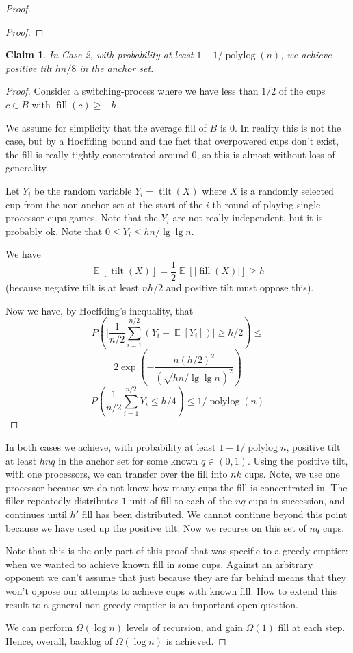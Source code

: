 \documentclass[twocolumn]{article}[11pt]
\DeclareMathOperator{\E}{\mathbb{E}}
\DeclareMathOperator{\polylog}{\text{polylog}}
\DeclareMathOperator{\tilt}{\text{tilt}}
\DeclareMathOperator{\fil}{\text{fill}}
\newtheorem{clm}{Claim}
\begin{document}
\begin{proof}
\begin{proof}
\end{proof}

\begin{clm}
  \label{clm:xtreme}
  In Case 2, with probability at least $1- 1/\polylog(n)$, we achieve positive tilt $hn/8$ in the anchor set.
\end{clm}

\begin{proof}
  Consider a switching-process where we have less than $1/2$ of the cups $c\in B$
  with $\fil(c) \ge -h$.


  We assume for simplicity that the average fill of $B$ is $0$. In reality this
  is not the case, but by a Hoeffding bound and the fact that overpowered cups don't
  exist, the fill is really tightly concentrated around $0$, so this is almost
  without loss of generality.

  Let $Y_i$ be the random variable $Y_i=\tilt(X)$ where $X$ is a randomly
  selected cup from the non-anchor set at the start of the $i$-th round of
  playing single processor cups games. {\color{red}Note that the $Y_i$ are not really
  independent, but it is probably ok}. Note that $0\le Y_i \le hn/\lg\lg n$.

  We have
  $$\E[\tilt(X)] = \frac{1}{2}\E[|\fil(X)|] \ge h$$
  (because negative tilt is at least $nh/2$ and positive tilt must oppose this).
  
  Now we have, by Hoeffding's inequality, that 
  $$P\left(\Big|\frac{1}{n/2} \sum_{i=1}^{n/2} (Y_i - \E[Y_i])\Big|\ge h/2
  \right) \le$$
  $$2\exp\left(-\frac{n(h/2)^2}{(\sqrt{hn/\lg\lg n})^2}\right) $$
  $$P\left(\frac{1}{n/2}\sum_{i=1}^{n/2} Y_i \le h/4\right) \le 1/\polylog(n) $$

\end{proof}

  In both cases we achieve, with probability at least $1-1/\polylog n$,
  positive tilt at least $hnq$ in the anchor set for some known $q\in(0,1)$. Using the
  positive tilt, with one processors, we can transfer over the fill into $nk$ cups. 
  Note, we use one processor because we do not know how many cups the fill is
  concentrated in. The filler repeatedly distributes $1$ unit of fill to each
  of the $nq$ cups in succession, and continues until $h'$ fill has been
  distributed. We cannot continue beyond this point because we have used up the
  positive tilt. Now we recurse on this set of $nq$ cups.

  Note that this is the only part of this proof that was specific to a greedy
  emptier: when we wanted to achieve known fill in some cups. Against an
  arbitrary opponent we can't assume that just because they are far behind
  means that they won't oppose our attempts to achieve cups with known fill.
  How to extend this result to a general non-greedy emptier is an important
  open question.

  We can perform $\Omega(\log n)$ levels of recursion, and gain $\Omega(1)$
  fill at each step. Hence, overall, backlog of $\Omega(\log n)$ is achieved.
\end{proof}
\end{document}
